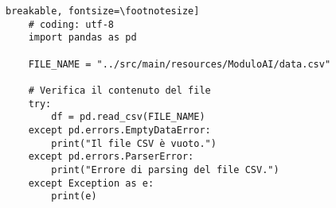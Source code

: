 \documentclass{article}
\begin{document}
\begin{lstlisting}[caption=Esempio di codice Python]
breakable, fontsize=\footnotesize]
    # coding: utf-8
    import pandas as pd
    
    FILE_NAME = "../src/main/resources/ModuloAI/data.csv"
    
    # Verifica il contenuto del file
    try:
        df = pd.read_csv(FILE_NAME)
    except pd.errors.EmptyDataError:
        print("Il file CSV è vuoto.")
    except pd.errors.ParserError:
        print("Errore di parsing del file CSV.")
    except Exception as e:
        print(e)
\end{lstlisting}
\end{document}
